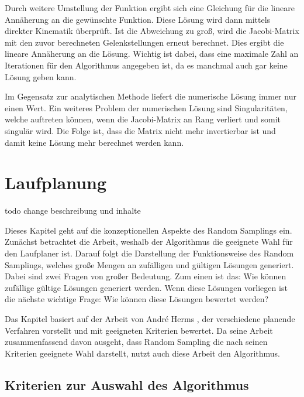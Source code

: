 Durch weitere Umstellung der Funktion ergibt sich eine Gleichung für die lineare Annäherung an die gewünschte Funktion. Diese Lösung wird dann mittels direkter Kinematik überprüft. Ist die Abweichung zu groß, wird die Jacobi-Matrix mit den zuvor berechneten Gelenkstellungen erneut berechnet. Dies ergibt die lineare Annäherung an die Lösung. Wichtig ist dabei, dass eine maximale Zahl an Iterationen für den Algorithmus angegeben ist, da es manchmal auch gar keine Lösung geben kann.

Im Gegensatz zur analytischen Methode liefert die numerische Lösung immer nur einen Wert. Ein weiteres Problem der numerischen Lösung sind Singularitäten, welche auftreten können, wenn die Jacobi-Matrix an Rang verliert und somit singulär wird. Die Folge ist, dass die Matrix nicht mehr invertierbar ist und damit keine Lösung mehr berechnet werden kann. 

\section{Laufplanung}

todo change beschreibung und inhalte

Dieses Kapitel geht auf die konzeptionellen Aspekte des Random Samplings ein. Zunächst betrachtet die Arbeit, weshalb der Algorithmus die geeignete Wahl für den Laufplaner ist. Darauf folgt die Darstellung der Funktionsweise des Random Samplings, welches große Mengen an zufälligen und gültigen Lösungen generiert.  Dabei sind zwei Fragen von großer Bedeutung. Zum einen ist das: Wie können zufällige gültige Lösungen generiert werden. Wenn diese Lösungen vorliegen ist die nächste wichtige Frage: Wie können diese Lösungen bewertet werden?

Das Kapitel basiert auf der Arbeit von André Herms \autocite{herms2004}, der verschiedene planende Verfahren vorstellt und mit geeigneten Kriterien bewertet. Da seine Arbeit zusammenfassend davon ausgeht, dass Random Sampling die nach seinen Kriterien geeignete Wahl darstellt, nutzt auch diese Arbeit den Algorithmus.

\subsection{Kriterien zur Auswahl des Algorithmus}

